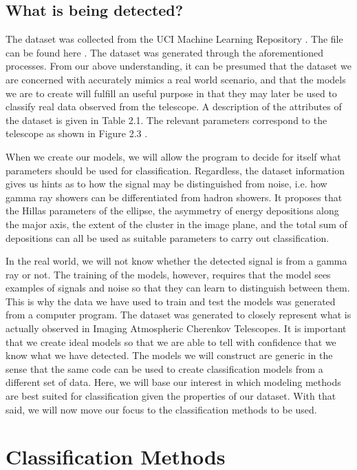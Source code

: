 \documentclass[a4paper, 12pt]{report}
\theoremstyle{definition}
\begin{document}
\section{What is being detected?}

The dataset was collected from the UCI Machine Learning Repository \autocite{repository}. The file can be found here \autocite{dataset}. The dataset was generated through the aforementioned processes. From our above understanding, it can be presumed that the dataset we are concerned with accurately mimics a real world scenario, and that the models we are to create will fulfill an useful purpose in that they may later be used to classify real data observed from the telescope. A description of the attributes of the dataset is given in Table 2.1. The relevant parameters correspond to the telescope as shown in Figure 2.3 \autocite{bock_wittek_2003}.

When we create our models, we will allow the program to decide for itself what parameters should be used for classification. Regardless, the dataset information \autocite{dataset} gives us hints as to how the signal may be distinguished from noise, i.e. how gamma ray showers can be differentiated from hadron showers. It proposes that the Hillas parameters of the ellipse, the asymmetry of energy depositions along the major axis, the extent of the cluster in the image plane, and the total sum of depositions can all be used as suitable parameters to carry out classification.

In the real world, we will not know whether the detected signal is from a gamma ray or not. The training of the models, however, requires that the model sees examples of signals and noise so that they can learn to distinguish between them. This is why the data we have used to train and test the models was generated from a computer program. The dataset was generated to closely represent what is actually observed in Imaging Atmospheric Cherenkov Telescopes. It is important that we create ideal models so that we are able to tell with confidence that we know what we have detected. The models we will construct are generic in the sense that the same code can be used to create classification models from a different set of data. Here, we will base our interest in which modeling methods are best suited for classification given the properties of our dataset. With that said, we will now move our focus to the classification methods to be used.

\chapter{Classification Methods}
\end{document}
